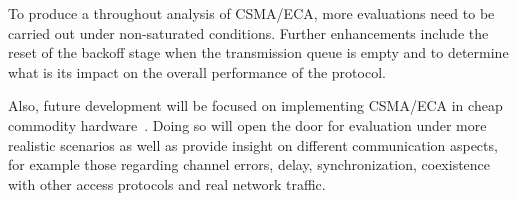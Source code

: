 To produce a throughout analysis of CSMA/ECA, more evaluations need to be carried out under non-saturated conditions. Further enhancements include the reset of the backoff stage when the transmission queue is empty and to determine what is its impact on the overall performance of the protocol.


Also, future development will be focused on implementing CSMA/ECA in cheap commodity hardware~\cite{WMP}. Doing so will open the door for evaluation under more realistic scenarios as well as provide insight on different communication aspects, for example those regarding channel errors, delay, synchronization, coexistence with other access protocols and real network traffic. 

